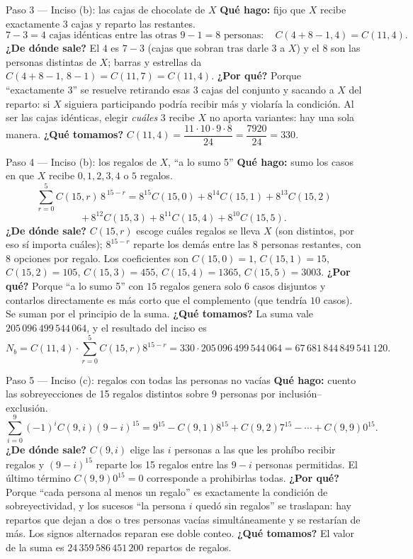 \documentclass[11pt]{article}
\begin{document}
\begin{paso}{Paso 3 --- Inciso (b): las cajas de chocolate de $X$}
\textbf{Qué hago:} fijo que $X$ recibe exactamente 3 cajas y reparto las restantes.
\[
7-3=4 \text{ cajas idénticas entre las otras } 9-1=8 \text{ personas}:\quad C(4+8-1,4)=C(11,4).
\]
\textbf{¿De dónde sale?} El $4$ es $7-3$ (cajas que sobran tras darle 3 a $X$) y el $8$ son las personas distintas de $X$; barras y estrellas da $C(4+8-1,\,8-1)=C(11,7)=C(11,4)$.
\textbf{¿Por qué?} Porque ``exactamente 3'' se resuelve retirando esas 3 cajas del conjunto y sacando a $X$ del reparto: si $X$ siguiera participando podría recibir más y violaría la condición. Al ser las cajas idénticas, elegir \emph{cuáles} 3 recibe $X$ no aporta variantes: hay una sola manera.
\textbf{¿Qué tomamos?} $C(11,4)=\dfrac{11\cdot10\cdot9\cdot8}{24}=\dfrac{7920}{24}=330$.
\end{paso}

\begin{paso}{Paso 4 --- Inciso (b): los regalos de $X$, ``a lo sumo 5''}
\textbf{Qué hago:} sumo los casos en que $X$ recibe $0,1,2,3,4$ o $5$ regalos.
\[
\sum_{r=0}^{5}C(15,r)\,8^{\,15-r}
=8^{15}C(15,0)+8^{14}C(15,1)+8^{13}C(15,2)
\]
\[
+\,8^{12}C(15,3)+8^{11}C(15,4)+8^{10}C(15,5).
\]
\textbf{¿De dónde sale?} $C(15,r)$ escoge cuáles regalos se lleva $X$ (son distintos, por eso sí importa cuáles); $8^{15-r}$ reparte los demás entre las $8$ personas restantes, con $8$ opciones por regalo. Los coeficientes son $C(15,0)=1$, $C(15,1)=15$, $C(15,2)=105$, $C(15,3)=455$, $C(15,4)=1365$, $C(15,5)=3003$.
\textbf{¿Por qué?} Porque ``a lo sumo 5'' con $15$ regalos genera solo $6$ casos disjuntos y contarlos directamente es más corto que el complemento (que tendría $10$ casos). Se suman por el principio de la suma.
\textbf{¿Qué tomamos?} La suma vale $205\,096\,499\,544\,064$, y el resultado del inciso es
\[
N_b=C(11,4)\cdot\sum_{r=0}^{5}C(15,r)8^{15-r}=330\cdot 205\,096\,499\,544\,064=67\,681\,844\,849\,541\,120 .
\]
\end{paso}

\begin{paso}{Paso 5 --- Inciso (c): regalos con todas las personas no vacías}
\textbf{Qué hago:} cuento las sobreyecciones de 15 regalos distintos sobre 9 personas por inclusión--exclusión.
\[
\sum_{i=0}^{9}(-1)^iC(9,i)(9-i)^{15}
=9^{15}-C(9,1)8^{15}+C(9,2)7^{15}-\cdots+C(9,9)0^{15}.
\]
\textbf{¿De dónde sale?} $C(9,i)$ elige las $i$ personas a las que les prohíbo recibir regalos y $(9-i)^{15}$ reparte los 15 regalos entre las $9-i$ personas permitidas. El último término $C(9,9)0^{15}=0$ corresponde a prohibirlas todas.
\textbf{¿Por qué?} Porque ``cada persona al menos un regalo'' es exactamente la condición de sobreyectividad, y los sucesos ``la persona $i$ quedó sin regalos'' se traslapan: hay repartos que dejan a dos o tres personas vacías simultáneamente y se restarían de más. Los signos alternados reparan ese doble conteo.
\textbf{¿Qué tomamos?} El valor de la suma es $24\,359\,586\,451\,200$ repartos de regalos.
\end{paso}
\end{document}
